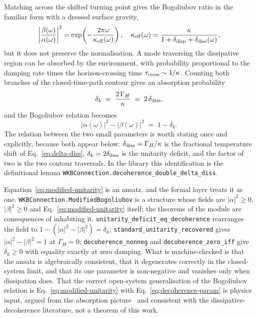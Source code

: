 \documentclass[aps,prd,reprint,nofootinbib,superscriptaddress]{revtex4-2}
\begin{document}
Matching across the shifted turning point gives the Bogoliubov ratio in
the familiar form with a dressed surface gravity,
\begin{equation}
\left|\frac{\beta(\omega)}{\alpha(\omega)}\right|^2
  = \exp\!\left(-\frac{2\pi\omega}{\kappa_{\rm eff}(\omega)}\right),
\quad
\kappa_{\rm eff}(\omega)
  = \frac{\kappa}{1 + \delta_{\rm disp} + \delta_{\rm diss}(\omega)} ,
\label{eq:bogo-ratio}
\end{equation}
but it does not preserve the normalisation. A mode traversing the
dissipative region can be absorbed by the environment, with probability
proportional to the damping rate times the horizon-crossing time
$\tau_{\rm cross} \sim 1/\kappa$. Counting both branches of the
closed-time-path contour gives an absorption probability
\begin{equation}
\delta_k \;=\; \frac{2\,\Gamma_H}{\kappa} \;=\; 2\,\delta_{\rm diss} ,
\label{eq:decoherence-param}
\end{equation}
and the Bogoliubov relation becomes
\begin{equation}
|\alpha(\omega)|^2 - |\beta(\omega)|^2 \;=\; 1 - \delta_k .
\label{eq:modified-unitarity}
\end{equation}
The relation between the two small parameters is worth stating once and
explicitly, because both appear below: $\delta_{\rm diss} = \Gamma_H/\kappa$
is the fractional temperature shift of Eq.~\eqref{eq:delta-diss},
$\delta_k = 2\delta_{\rm diss}$ is the unitarity deficit, and the
factor of two is the two contour traversals. In the library this
identification is the definitional lemma
\texttt{WKBConnection.decoherence\_double\_delta\_diss}.

Equation~\eqref{eq:modified-unitarity} is an ansatz, and the formal
layer treats it as one. \texttt{WKBConnection.ModifiedBogoliubov} is a
structure whose fields are $|\alpha|^2 \geq 0$, $|\beta|^2 \geq 0$ and
Eq.~\eqref{eq:modified-unitarity} itself; the theorems of the module are
consequences of inhabiting it.
\texttt{unitarity\_deficit\_eq\_decoherence} rearranges the field to
$1 - (|\alpha|^2 - |\beta|^2) = \delta_k$;
\texttt{standard\_unitarity\_recovered} gives
$|\alpha|^2 - |\beta|^2 = 1$ at $\Gamma_H = 0$;
\texttt{decoherence\_nonneg} and \texttt{decoherence\_zero\_iff} give
$\delta_k \geq 0$ with equality exactly at zero damping. What is
machine-checked is that the ansatz is algebraically consistent, that it
degenerates correctly in the closed-system limit, and that its one
parameter is non-negative and vanishes only when dissipation does. That
the correct open-system generalisation of the Bogoliubov relation is
Eq.~\eqref{eq:modified-unitarity} with Eq.~\eqref{eq:decoherence-param}
is physics input, argued from the absorption
picture~\cite{RobertsonParentani2015} and consistent with the
dissipative-decoherence literature, not a theorem of this work.
\end{document}
